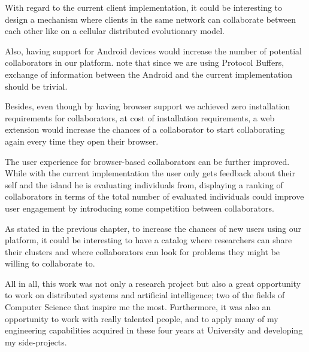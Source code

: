 With regard to the current client implementation, it could be interesting to design a mechanism where clients in the same network can collaborate between each other like on a cellular distributed evolutionary model. 

Also, having support for Android devices would increase the number of potential collaborators in our platform. note that since we are using Protocol Buffers, exchange of information between the Android and the current implementation should be trivial. 

Besides, even though by having browser support we achieved zero installation requirements for collaborators, at cost of installation requirements, a web extension would increase the chances of a collaborator to start collaborating again every time they open their browser.

The user experience for browser-based collaborators can be further improved. While with the current implementation the user only gets feedback about their self and the island he is evaluating individuals from, displaying a ranking of collaborators in terms of the total number of evaluated individuals could improve user engagement by introducing some competition between collaborators. 

As stated in the previous chapter, to increase the chances of new users using our platform, it could be interesting to have a catalog where researchers can share their clusters and where collaborators can look for problems they might be willing to collaborate to.

All in all, this work was not only a research project but also a great opportunity to work on distributed systems and artificial intelligence; two of the fields of Computer Science that inspire me the most. Furthermore, it was also an opportunity to work with really talented people, and to apply many of my engineering capabilities acquired in these four years at University and developing my side-projects.